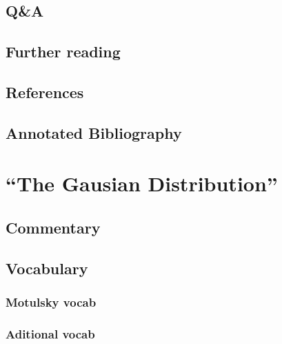 \documentclass[]{book}
\theoremstyle{definition}
\theoremstyle{definition}
\theoremstyle{definition}
\theoremstyle{remark}
\begin{document}
\section{Q\&A}\label{qa-1}

\section*{Further reading}\label{further-reading-7}

\section*{References}\label{references-7}

\section*{Annotated Bibliography}\label{annotated-bibliography-4}

\chapter{\texorpdfstring{``The Gausian
Distribution''}{The Gausian Distribution}}\label{ch10}

\section*{Commentary}\label{commentary-8}

\section*{Vocabulary}\label{vocabulary-9}

\subsection*{Motulsky vocab}\label{motulsky-vocab-9}

\subsection*{Aditional vocab}\label{aditional-vocab-6}
\end{document}
